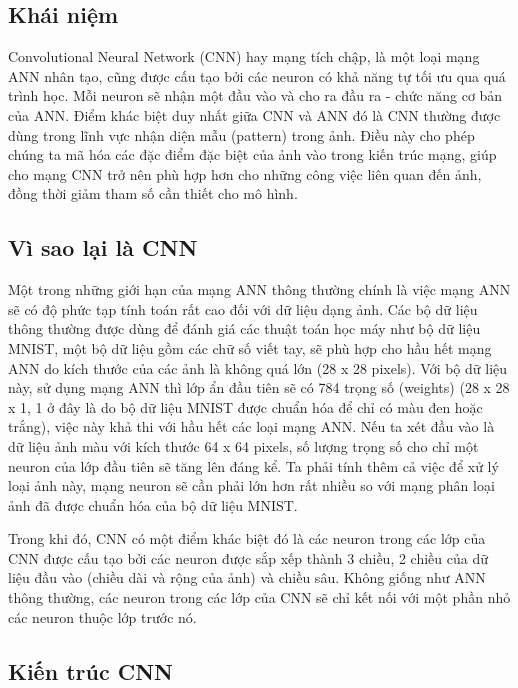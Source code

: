 \subsection{Khái niệm}
Convolutional Neural Network (CNN) hay mạng tích chập, là một loại mạng ANN nhân tạo, cũng được cấu tạo bởi các neuron có khả năng tự tối ưu qua quá trình học. Mỗi neuron sẽ nhận một đầu vào và cho ra đầu ra - chức năng cơ bản của ANN. Điểm khác biệt duy nhất giữa CNN và ANN đó là CNN thường được dùng trong lĩnh vực nhận diện mẫu (pattern) trong ảnh. Điều này cho phép chúng ta mã hóa các đặc điểm đặc biệt của ảnh vào trong kiến trúc mạng, giúp cho mạng CNN trở nên phù hợp hơn cho những công việc liên quan đến ảnh, đồng thời giảm tham số cần thiết cho mô hình. \cite{oshea2015introduction}

\subsection{Vì sao lại là CNN}
Một trong những giới hạn của mạng ANN thông thường chính là việc mạng ANN sẽ có độ phức tạp tính toán rất cao đối với dữ liệu dạng ảnh. Các bộ dữ liệu thông thường được dùng để đánh giá các thuật toán học máy như bộ dữ liệu MNIST, một bộ dữ liệu gồm các chữ số viết tay, sẽ phù hợp cho hầu hết mạng ANN do kích thước của các ảnh là không quá lớn (28 x 28 pixels). Với bộ dữ liệu này, sử dụng mạng ANN thì lớp ẩn đầu tiên sẽ có 784 trọng số (weights) (28 x 28 x 1, 1 ở đây là do bộ dữ liệu MNIST được chuẩn hóa để chỉ có màu đen hoặc trắng), việc này khả thi với hầu hết các loại mạng ANN. Nếu ta xét đầu vào là dữ liệu ảnh màu với kích thước 64 x 64 pixels, số lượng trọng số cho chỉ một neuron của lớp đầu tiên sẽ tăng lên đáng kể. Ta phải tính thêm cả việc để xử lý loại ảnh này, mạng neuron sẽ cần phải lớn hơn rất nhiều so với mạng phân loại ảnh đã được chuẩn hóa của bộ dữ liệu MNIST. \cite{oshea2015introduction}

Trong khi đó, CNN có một điểm khác biệt đó là các neuron trong các lớp của CNN được cấu tạo bởi các neuron được sắp xếp thành 3 chiều, 2 chiều của dữ liệu đầu vào (chiều dài và rộng của ảnh) và chiều sâu. Không giống như ANN thông thường, các neuron trong các lớp của CNN sẽ chỉ kết nối với một phần nhỏ các neuron thuộc lớp trước nó. \cite{oshea2015introduction}

\subsection{Kiến trúc CNN}

